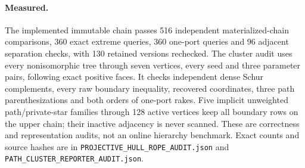 \paragraph{Measured.}
The implemented immutable chain passes 516 independent materialized-chain
comparisons, 360 exact extreme queries, 360 one-port queries and 96 adjacent
separation checks, with 130 retained versions rechecked. The cluster audit
uses every nonisomorphic tree through seven vertices, every seed and three
parameter pairs, following exact positive faces. It checks independent dense
Schur complements, every raw boundary inequality, recovered coordinates,
three path parenthesizations and both orders of one-port rakes. Five implicit
unweighted path/private-star families through 128 active vertices keep all
boundary rows on the upper chain; their inactive adjacency is never scanned.
These are correctness and representation audits, not an online hierarchy
benchmark. Exact counts and source hashes are in
\texttt{PROJECTIVE\_HULL\_ROPE\_AUDIT.json} and
\texttt{PATH\_CLUSTER\_REPORTER\_AUDIT.json}.
